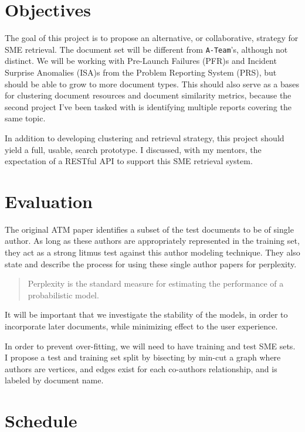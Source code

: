 \documentclass{article}
\begin{document}
\begin{multicols}{2}

\section{Objectives}

The goal of this project is to propose an alternative, or collaborative, strategy for
SME retrieval. The document set will be different from \texttt{A-Team}'s, although
not distinct. We will be working with Pre-Launch Failures (PFR)s and
Incident Surprise Anomalies (ISA)s from the Problem Reporting System
(PRS), but should be able to grow to more document types. This should also
serve as a bases for clustering document resources and document similarity metrics,
because the second project I've been tasked with is identifying multiple reports covering
the same topic.

In addition to developing clustering and retrieval strategy, this project should yield
a full, usable, search prototype. I discussed, with my mentors, the expectation of a
RESTful API to support this SME retrieval system.


\section{Evaluation}

The original ATM paper identifies a subset of the test documents to be of single author.
As long as these authors are appropriately represented in the training set, they act as
a strong litmus test against this author modeling technique. They also state and describe
the process for using these single author papers for perplexity.
\begin{quote}
  Perplexity is the standard measure for estimating the performance of a probabilistic model.
\end{quote}

It will be important that we investigate the stability of the models\cite{Yang2016}, in order
to incorporate later documents, while minimizing effect to the user experience.

In order to prevent over-fitting, we will need to have training and test SME sets.
I propose a test and training set split by bisecting by min-cut\cite{Feige2002} a graph where
authors are vertices, and edges exist for each co-authors relationship, and is labeled by
document name.

\pagebreak
\section{Schedule}


\end{multicols}
\end{document}
